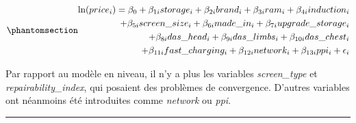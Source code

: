 \documentclass[
  12pt,
]{report}
\begin{document}
\begin{equation}\phantomsection\label{eq-log-hedonic}{
\begin{split}
\ln(price_i) = \beta_0 + \beta_{1i} storage_i + \beta_{2i}brand_i + \beta_{3i}ram_i + \beta_{4i}induction_i \\
+ \beta_{5i}screen\_size_i + \beta_{6i}made\_in_i + \beta_{7i}upgrade\_storage_i \\
+ \beta_{8i}das\_head_i + \beta_{9i}das\_limbs_i + \beta_{10i}das\_chest_i  \\
+ \beta_{11i}fast\_charging_i + \beta_{12i}network_i + \beta_{13i}ppi_i + \epsilon_i
\end{split}
}\end{equation}

Par rapport au modèle en niveau, il n'y a plus les variables
\emph{screen\_type} et \emph{repairability\_index}, qui posaient des
problèmes de convergence. D'autres variables ont néanmoins été
introduites comme \emph{network} ou \emph{ppi}.

\begin{center}\rule{0.5\linewidth}{0.5pt}\end{center}
\end{document}
